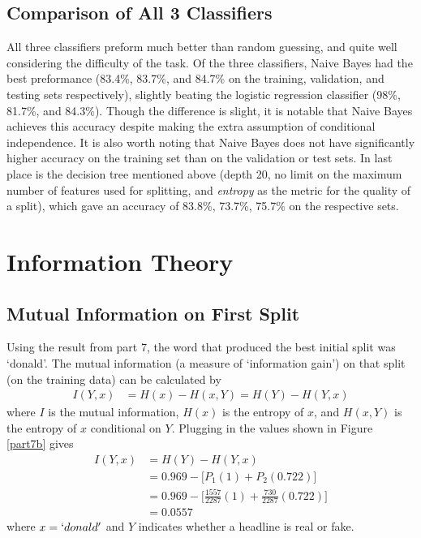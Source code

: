 \documentclass{article}
\begin{document}
   \subsection{Comparison of All 3 Classifiers}
   All three classifiers preform much better than random guessing, and quite well considering the
   difficulty of the task. Of the three classifiers, Naive Bayes had the best preformance (83.4\%, 83.7\%,
   and 84.7\% on the training, validation, and testing sets respectively), slightly beating the logistic
   regression classifier (98\%, 81.7\%, and 84.3\%). Though the difference is slight, it is notable that
   Naive Bayes achieves this accuracy despite making the extra assumption of conditional independence. It
   is also worth noting that Naive Bayes does not have significantly higher accuracy on the training set than
   on the validation or test sets.
   In last place is the decision tree mentioned above (depth 20, no limit on the maximum number of features
   used for splitting, and \textit{entropy} as the metric for the quality of a split), which gave an accuracy
   of 83.8\%, 73.7\%, 75.7\% on the respective sets.




   \section{Information Theory}
   \subsection{Mutual Information on First Split}
   Using the result from part 7, the word that produced the best initial split was `donald'. The mutual information
   (a measure of `information gain') on that split (on the training data) can be calculated by
   \begin{equation*} \begin{split}
      I(Y, x)  &= H(x) - H(x, Y) = H(Y) - H(Y,x)
   \end{split} \end{equation*}
   where $I$ is the mutual information, $H(x)$ is the entropy of $x$, and $H(x, Y)$ is the entropy of $x$ conditional
   on $Y$.
   Plugging in the values shown in Figure \ref{part7b} gives
   \begin{equation*} \begin{split}
      I(Y, x)  &= H(Y) - H(Y,x) \\
               &= 0.969 - \bigg[ P_1 (1) + P_2 (0.722)  \bigg] \\
               &= 0.969 - \bigg[ \frac{1557}{2287} (1) + \frac{730}{2287} (0.722)  \bigg] \\
               &= 0.0557
   \end{split} \end{equation*}
   where $x = `donald'$ and $Y$ indicates whether a headline is real or fake.
\end{document}
